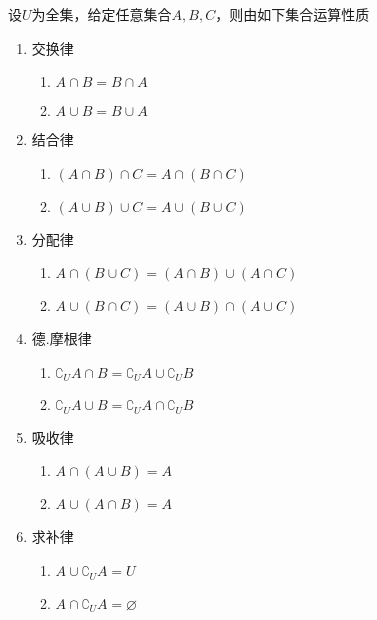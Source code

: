 \begin{property}\label{property:set-operation}
设$U$为全集，给定任意集合$A, B, C$，则由如下集合运算性质
	\begin{enumerate}
		\item 交换律
		\begin{enumerate}
			\item $A \cap B = B \cap A$
			\item $A \cup B = B \cup A$
		\end{enumerate}
		\item 结合律
		\begin{enumerate}
			\item $(A \cap B) \cap C = A \cap (B \cap C)$
			\item $(A \cup B) \cup C = A \cup (B \cup C)$
		\end{enumerate}
		\item 分配律
		\begin{enumerate}
			\item $A \cap (B \cup C) = (A \cap B) \cup (A \cap C)$
			\item $A \cup (B \cap C) = (A \cup B) \cap (A \cup C)$
		\end{enumerate}
		\item 德.摩根律
		\begin{enumerate}
			\item $\complement_{U}{A \cap B} = \complement_{U}{A} \cup \complement_{U}{B}$
			\item $\complement_{U}{A \cup B} = \complement_{U}{A} \cap \complement_{U}{B}$
		\end{enumerate}
		\item 吸收律
		\begin{enumerate}
			\item $A \cap (A \cup B) = A$
			\item $A \cup (A \cap B) = A$
		\end{enumerate}
		\item 求补律
		\begin{enumerate}
			\item $A \cup \complement_{U}{A} = U$
			\item $A \cap \complement_{U}{A} = \varnothing$
		\end{enumerate}
	\end{enumerate}
\end{property}

